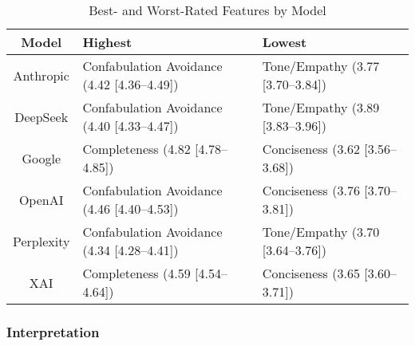 \documentclass[
  11pt]{report}
\begin{document}
\begin{table}
\caption*{
{\large Best- and Worst-Rated Features by Model}
} 
\fontsize{12.0pt}{14.4pt}\selectfont
\begin{tabular*}{\linewidth}{@{\extracolsep{\fill}}cll}
\toprule
Model & Highest & Lowest \\ 
\midrule\addlinespace[2.5pt]
Anthropic & Confabulation Avoidance (4.42 [4.36–4.49]) & Tone/Empathy (3.77 [3.70–3.84]) \\ 
DeepSeek & Confabulation Avoidance (4.40 [4.33–4.47]) & Tone/Empathy (3.89 [3.83–3.96]) \\ 
Google & Completeness (4.82 [4.78–4.85]) & Conciseness (3.62 [3.56–3.68]) \\ 
OpenAI & Confabulation Avoidance (4.46 [4.40–4.53]) & Conciseness (3.76 [3.70–3.81]) \\ 
Perplexity & Confabulation Avoidance (4.34 [4.28–4.41]) & Tone/Empathy (3.70 [3.64–3.76]) \\ 
XAI & Completeness (4.59 [4.54–4.64]) & Conciseness (3.65 [3.60–3.71]) \\ 
\bottomrule
\end{tabular*}
\end{table}

\subsubsection{Interpretation}\label{interpretation}
\end{document}
